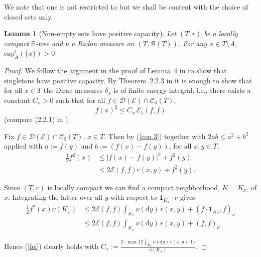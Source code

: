 \documentclass[11pt]{amsart}
\numberwithin{equation}{section}
\newtheorem{lemma}[definition]{Lemma}
\begin{document}
{We note that one is not restricted to but we shall be content with the
choice of closed sets only.{\smallskip}

\begin{lemma}[Non-empty sets have positive capacity] Let $(T,r)$ be a locally compact ${{\mathbb R}}$-tree and $\nu$ a Radon measure {on $(T,{\mathcal B}(T))$}. {
For 
any $x\in T\setminus A$, $\mathrm{cap}^1_{A}(\{x\})>0$}.
\label{L:02}
\end{lemma}{\smallskip}

\begin{proof} We follow the argument in the proof of Lemma~4 in \cite{Kre95} to
show that singletons have positive capacity. By Theorem~2.2.3 in
\cite{FukushimaOshimaTakeda1994} it is enough to show that
for all $x\in T$ the Dirac measures $\delta_x$ is of finite energy integral, i.e.,
there exists a constant $C_x>0$ such that for all $f\in{\mathcal D}({\mathcal E})\cap {\mathcal C}_0(T)$,
\begin{equation}\label{fei}
   f(x)^2\le C_x\,{\mathcal E}_1(f,f)
\end{equation}
(compare (2.2.1) in \cite{FukushimaOshimaTakeda1994}).

Fix $f\in{\mathcal D}({\mathcal E})\cap {\mathcal C}_0(T)$, $x\in T$. Then by (\ref{con.3}) together with $2ab\le a^2+b^2$ applied with $a:=f(y)$ and $b:=(f(x)-f(y))$,
for all $x,y\in T$,
\begin{equation}
\label{e:dirac}
\begin{aligned}
\tfrac{1}{2} f^2(x)&\le |f(x)-f(y)|^2+f^2(y)\\&\le 2{\mathcal E}(f,f)r(x,y)+f^2(y).
\end{aligned}
\end{equation}

Since $(T,r)$ is locally compact we can find a compact neighborhood, $K=K_x$, of $x$.
Integrating the latter over all $y$ with respect to $\mathbf{1}_{K_x}\cdot\nu$ gives
\begin{equation}
\label{e:dirac1}
\begin{aligned}
  \tfrac{1}{2}f^2(x)\nu(K_x)&\le 2{\mathcal E}(f,f)\int_{K_x}\nu(\mathrm{d}y)\,r(x,y)+(f\cdot \mathbf{1}_{K_x},f)_\nu
 \\
 &\le
   2{\mathcal E}(f,f)\int_{K_x}\nu(\mathrm{d}y)\,r(x,y)+(f,f)_\nu
\end{aligned}
\end{equation}

Hence (\ref{fei}) clearly holds with $C_x:=\frac{2\cdot\max \{2\int_{K_x}\nu(\mathrm{d}y)\,r(x,y);1\}}{\nu(K_x)}$.
\end{proof}
{\smallskip}

}
\end{document}
